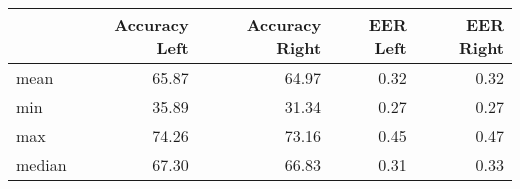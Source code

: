 \begin{tabular}{lrrrr}
\toprule
{} &  Accuracy Left &  Accuracy Right &  EER Left &  EER Right \\
\midrule
mean   &          65.87 &           64.97 &      0.32 &       0.32 \\
min    &          35.89 &           31.34 &      0.27 &       0.27 \\
max    &          74.26 &           73.16 &      0.45 &       0.47 \\
median &          67.30 &           66.83 &      0.31 &       0.33 \\
\bottomrule
\end{tabular}
